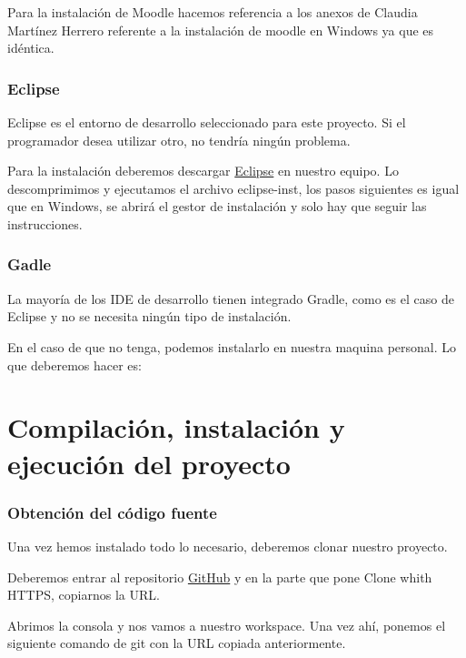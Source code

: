 Para la instalación de Moodle hacemos referencia a los anexos de Claudia Martínez Herrero \cite{claudia:anexo} referente a la instalación de moodle en Windows ya que es idéntica.

\subsubsection{Eclipse}\label{git}

Eclipse es el entorno de desarrollo seleccionado para este proyecto. Si el programador desea utilizar otro, no tendría ningún problema.

Para la instalación deberemos descargar \href{http://www.eclipse.org/downloads/}{Eclipse} en nuestro equipo. Lo descomprimimos y ejecutamos el archivo eclipse-inst, los pasos siguientes es igual que en Windows, se abrirá el gestor de instalación y solo hay que seguir las instrucciones.

\subsubsection{Gadle}\label{git}

La mayoría de los IDE de desarrollo tienen integrado Gradle, como es el caso de Eclipse y no se necesita ningún tipo de instalación.

En el caso de que no tenga, podemos instalarlo en nuestra maquina personal. Lo que deberemos hacer es:


\section{Compilación, instalación y ejecución del proyecto}

\subsubsection{Obtención del código fuente}\label{obtención-del-código-fuente}

Una vez hemos instalado todo lo necesario, deberemos clonar nuestro proyecto.

Deberemos entrar al repositorio \href{https://github.com/trona85/GII-17.1B-UBULog-1.0}{GitHub} y en la parte que pone Clone whith HTTPS, copiarnos la URL.


Abrimos la consola y nos vamos a nuestro workspace. Una vez ahí, ponemos el siguiente comando de git con la URL copiada anteriormente.

